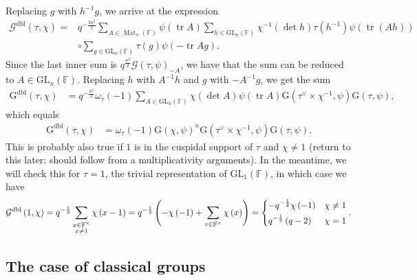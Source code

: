 \documentclass[12pt, reqno]{amsart}
\theoremstyle{definition}
\theoremstyle{definition}
\theoremstyle{definition}
\newcommand{\multiplicativegroup}[1]{#1^{\times}}
\newcommand{\fieldCharacter}{\psi}
\newcommand{\centralCharacter}[1]{\omega_{#1}}
\newcommand{\Contragradient}[1]{#1^{\vee}}
\newcommand{\trace}{\operatorname{tr}}
\newcommand{\GL}{\mathrm{GL}}
\newcommand{\finiteField}{\mathbb{F}}
\newcommand{\squareMatrix}{\operatorname{Mat}}
\newcommand{\GaussSum}[2]{\mathcal{G}\left(#1, #2\right)}
\newcommand{\dblGaussSum}[2]{\mathcal{G}^{\mathrm{dbl}}\left(#1, #2\right)}
\newcommand{\GaussSumScalar}[2]{\mathrm{G}\left(#1, #2\right)}
\newcommand{\dblGaussSumScalar}[2]{\mathrm{G}^{\mathrm{dbl}}\left(#1, #2\right)}
\begin{document}
Replacing $g$ with $h^{-1} g$, we arrive at the expression
\begin{align*}
	\dblGaussSum{\tau}{\chi} =& q^{-\frac{3n^2}{2}} \sum_{A \in \squareMatrix_n\left(\finiteField\right)} \fieldCharacter\left(\trace A\right) \sum_{h \in \GL_n\left(\finiteField\right)} \chi^{-1}\left(\det h\right) \tau\left(h^{-1}\right) \fieldCharacter\left(\trace\left(Ah\right)\right)\\
	& \circ \sum_{g \in \GL_n\left(\finiteField\right)} \tau\left(g\right) \fieldCharacter\left(-\trace Ag\right).
\end{align*}
Since the last inner sum is $q^{\frac{n^2}{2}} \GaussSum{\tau}{\fieldCharacter}_{-A}$, we have that the sum can be reduced to $A \in \GL_n\left(\finiteField\right)$. Replacing $h$ with $A^{-1} h$ and $g$ with $-A^{-1} g$, we get the sum
\begin{align*}
	\dblGaussSumScalar{\tau}{\chi} &= q^{-\frac{n^2}{2}} \centralCharacter{\tau}\left(-1\right) \sum_{A \in \GL_n\left(\finiteField\right)} \chi\left(\det A\right) \fieldCharacter\left(\trace A\right) \GaussSumScalar{\Contragradient{\tau} \times \chi^{-1}}{\fieldCharacter} \GaussSumScalar{\tau}{\fieldCharacter},
\end{align*}
which equals
\begin{align*}
	\dblGaussSumScalar{\tau}{\chi} &=  \centralCharacter{\tau}\left(-1\right) \GaussSumScalar{\chi}{\fieldCharacter}^n \GaussSumScalar{\Contragradient{\tau} \times \chi^{-1}}{\fieldCharacter} \GaussSumScalar{\tau}{\fieldCharacter}.
\end{align*}
This is probably also true if $1$ is in the cuspidal support of $\tau$  and $\chi \ne 1$ (return to this later: should follow from a multiplicativity arguments). In the meantime, we will check this for $\tau = 1$, the trivial representation of $\GL_1\left(\finiteField\right)$, in which case we have
$$\dblGaussSum{1}{\chi} = q^{-\frac{1}{2}} \sum_{\substack{x \in \multiplicativegroup{\finiteField} \\
		x \ne 1}} \chi\left(x - 1\right) = q^{-\frac{1}{2}}\left(-\chi\left(-1\right) + \sum_{x \in \multiplicativegroup{\finiteField}} \chi\left(x\right) \right) = \begin{dcases}
		-q^{-\frac{1}{2}} \chi\left(-1\right) & \chi \ne 1\\
		q^{-\frac{1}{2}} \left(q - 2\right) & \chi = 1
	\end{dcases}.$$

\subsection{The case of classical groups}
\end{document}
